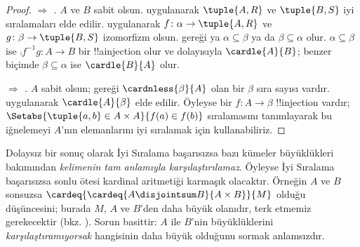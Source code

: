 \begin{proof}
\emph{ $\Rightarrow$ .} $A$ ve $B$
sabit olsun.  uygulanarak $\tuple{A,R}$ ve
$\tuple{B,S}$ iyi sıralamaları elde edilir.
 uygulanarak
$f\colon\alpha\to\tuple{A,R}$ ve
$g\colon\beta\to\tuple{B,S}$ izomorfizm olsun.
 gereği ya
$\alpha\subseteq\beta$ ya da $\beta\subseteq\alpha$ olur.
$\alpha\subseteq\beta$ ise
$\comp{f^{-1}}{g}\colon A\to B$ bir !!a{injection} olur ve dolayısıyla
$\cardle{A}{B}$; benzer biçimde $\beta\subseteq\alpha$ ise
$\cardle{B}{A}$ olur.

\emph{ $\Rightarrow$ .} $A$ sabit
olsun;  gereği $\cardnless{\beta}{A}$ olan bir
$\beta$ sıra sayısı vardır.  uygulanarak
$\cardle{A}{\beta}$ elde edilir. Öyleyse bir $f\colon A\to\beta$
!!{injection} vardır; $\Setabs{\tuple{a,b}\in A\times A}{f(a)\in f(b)}$
sıralamasını tanımlayarak bu iğnelemeyi $A$'nın elemanlarını iyi sıralamak
için kullanabiliriz.
\end{proof}
\noindent
Dolaysız bir sonuç olarak İyi Sıralama başarısızsa bazı kümeler
büyüklükleri bakımından \emph{kelimenin tam anlamıyla karşılaştırılamaz}.
Öyleyse İyi Sıralama başarısızsa sonlu ötesi kardinal aritmetiği karmaşık
olacaktır. Örneğin $A$ ve $B$ sonsuzsa
$\cardeq{\cardeq{A \disjointsum B}{A \times B}}{M}$ olduğu düşüncesini;
burada $M$, $A$ ve $B$'den daha büyük olanıdır, terk etmemiz gerekecektir
(bkz. ). Sorun basittir:
$A$ ile $B$'nin büyüklüklerini \emph{karşılaştıramıyorsak} hangisinin daha
büyük olduğunu sormak anlamsızdır.

